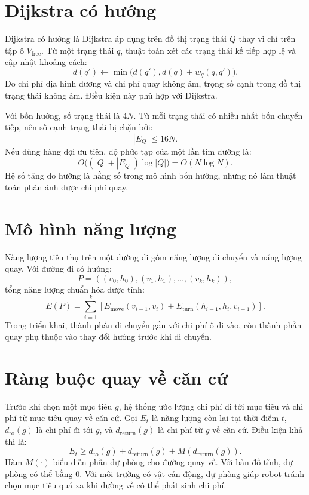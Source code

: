 \documentclass[../DoAn.tex]{subfiles}
\begin{document}
\section{Dijkstra có hướng}

Dijkstra có hướng là Dijkstra áp dụng trên đồ thị trạng thái $Q$ thay vì chỉ trên tập ô $V_{\text{free}}$. Từ một trạng thái $q$, thuật toán xét các trạng thái kế tiếp hợp lệ và cập nhật khoảng cách:
\begin{equation}
d(q')\leftarrow \min\bigl(d(q'),d(q)+w_q(q,q')\bigr).
\end{equation}
Do chi phí địa hình dương và chi phí quay không âm, trọng số cạnh trong đồ thị trạng thái không âm. Điều kiện này phù hợp với Dijkstra.

Với bốn hướng, số trạng thái là $4N$. Từ mỗi trạng thái có nhiều nhất bốn chuyển tiếp, nên số cạnh trạng thái bị chặn bởi:
\begin{equation}
|E_Q|\leq 16N.
\end{equation}
Nếu dùng hàng đợi ưu tiên, độ phức tạp của một lần tìm đường là:
\begin{equation}
O\bigl((|Q|+|E_Q|)\log |Q|\bigr)=O(N\log N).
\end{equation}
Hệ số tăng do hướng là hằng số trong mô hình bốn hướng, nhưng nó làm thuật toán phản ánh được chi phí quay.

\section{Mô hình năng lượng}

Năng lượng tiêu thụ trên một đường đi gồm năng lượng di chuyển và năng lượng quay. Với đường đi có hướng:
\begin{equation}
P=((v_0,h_0),(v_1,h_1),\ldots,(v_k,h_k)),
\end{equation}
tổng năng lượng chuẩn hóa được tính:
\begin{equation}
E(P)=\sum_{i=1}^{k}\left[E_{\text{move}}(v_{i-1},v_i)+E_{\text{turn}}(h_{i-1},h_i,v_{i-1})\right].
\end{equation}
Trong triển khai, thành phần di chuyển gắn với chi phí ô đi vào, còn thành phần quay phụ thuộc vào thay đổi hướng trước khi di chuyển.

\section{Ràng buộc quay về căn cứ}

Trước khi chọn một mục tiêu $g$, hệ thống ước lượng chi phí đi tới mục tiêu và chi phí từ mục tiêu quay về căn cứ. Gọi $E_t$ là năng lượng còn lại tại thời điểm $t$, $d_{\text{to}}(g)$ là chi phí đi tới $g$, và $d_{\text{return}}(g)$ là chi phí từ $g$ về căn cứ. Điều kiện khả thi là:
\begin{equation}
E_t\geq d_{\text{to}}(g)+d_{\text{return}}(g)+M(d_{\text{return}}(g)).
\end{equation}
Hàm $M(\cdot)$ biểu diễn phần dự phòng cho đường quay về. Với bản đồ tĩnh, dự phòng có thể bằng 0. Với môi trường có vật cản động, dự phòng giúp robot tránh chọn mục tiêu quá xa khi đường về có thể phát sinh chi phí.
\end{document}
